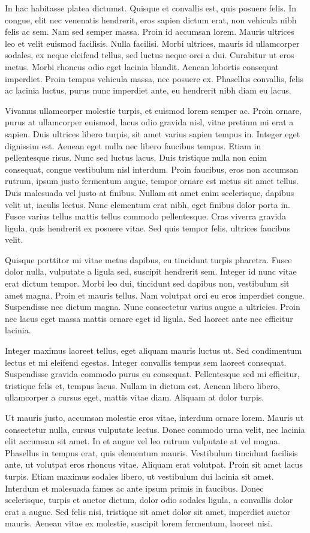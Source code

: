 In hac habitasse platea dictumst. Quisque et convallis est, quis posuere felis. In congue, elit nec venenatis hendrerit, eros sapien dictum erat, non vehicula nibh felis ac sem. Nam sed semper massa. Proin id accumsan lorem. Mauris ultrices leo et velit euismod facilisis. Nulla facilisi. Morbi ultrices, mauris id ullamcorper sodales, ex neque eleifend tellus, sed luctus neque orci a dui. Curabitur ut eros metus. Morbi rhoncus odio eget lacinia blandit. Aenean lobortis consequat imperdiet. Proin tempus vehicula massa, nec posuere ex. Phasellus convallis, felis ac lacinia luctus, purus nunc imperdiet ante, eu hendrerit nibh diam eu lacus.

Vivamus ullamcorper molestie turpis, et euismod lorem semper ac. Proin ornare, purus at ullamcorper euismod, lacus odio gravida nisl, vitae pretium mi erat a sapien. Duis ultrices libero turpis, sit amet varius sapien tempus in. Integer eget dignissim est. Aenean eget nulla nec libero faucibus tempus. Etiam in pellentesque risus. Nunc sed luctus lacus. Duis tristique nulla non enim consequat, congue vestibulum nisl interdum. Proin faucibus, eros non accumsan rutrum, ipsum justo fermentum augue, tempor ornare est metus sit amet tellus. Duis malesuada vel justo at finibus. Nullam sit amet enim scelerisque, dapibus velit ut, iaculis lectus. Nunc elementum erat nibh, eget finibus dolor porta in. Fusce varius tellus mattis tellus commodo pellentesque. Cras viverra gravida ligula, quis hendrerit ex posuere vitae. Sed quis tempor felis, ultrices faucibus velit.

Quisque porttitor mi vitae metus dapibus, eu tincidunt turpis pharetra. Fusce dolor nulla, vulputate a ligula sed, suscipit hendrerit sem. Integer id nunc vitae erat dictum tempor. Morbi leo dui, tincidunt sed dapibus non, vestibulum sit amet magna. Proin et mauris tellus. Nam volutpat orci eu eros imperdiet congue. Suspendisse nec dictum magna. Nunc consectetur varius augue a ultricies. Proin nec lacus eget massa mattis ornare eget id ligula. Sed laoreet ante nec efficitur lacinia.

Integer maximus laoreet tellus, eget aliquam mauris luctus ut. Sed condimentum lectus et mi eleifend egestas. Integer convallis tempus sem laoreet consequat. Suspendisse gravida commodo purus eu consequat. Pellentesque sed mi efficitur, tristique felis et, tempus lacus. Nullam in dictum est. Aenean libero libero, ullamcorper a cursus eget, mattis vitae diam. Aliquam at dolor turpis.

Ut mauris justo, accumsan molestie eros vitae, interdum ornare lorem. Mauris ut consectetur nulla, cursus vulputate lectus. Donec commodo urna velit, nec lacinia elit accumsan sit amet. In et augue vel leo rutrum vulputate at vel magna. Phasellus in tempus erat, quis elementum mauris. Vestibulum tincidunt facilisis ante, ut volutpat eros rhoncus vitae. Aliquam erat volutpat. Proin sit amet lacus turpis. Etiam maximus sodales libero, ut vestibulum dui lacinia sit amet. Interdum et malesuada fames ac ante ipsum primis in faucibus. Donec scelerisque, turpis et auctor dictum, dolor odio sodales ligula, a convallis dolor erat a augue. Sed felis nisi, tristique sit amet dolor sit amet, imperdiet auctor mauris. Aenean vitae ex molestie, suscipit lorem fermentum, laoreet nisi.

